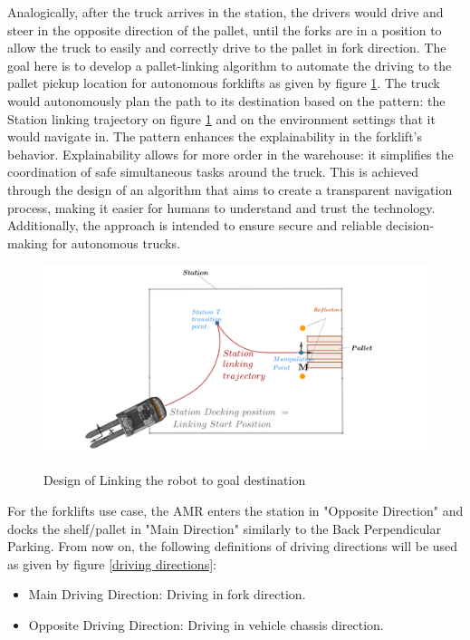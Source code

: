 Analogically, after the truck arrives in the station, the drivers would drive and steer in the opposite direction of the 
pallet, until the forks are in a position to allow the truck to easily and correctly drive to the pallet in fork direction.
The goal here is to develop a pallet-linking algorithm to automate the driving to the pallet pickup location for 
autonomous forklifts as given by figure \ref{pattern}. The truck would autonomously plan the path to its destination
based on the pattern: the Station linking trajectory on figure \ref{pattern} and on the environment settings that it would navigate in. 
The pattern enhances the explainability in the forklift's behavior. Explainability allows for more order in the warehouse: 
it simplifies the coordination of safe simultaneous tasks around the truck. This is achieved through the design of an 
algorithm that aims to create a transparent navigation process, making it easier for humans to understand and trust 
the technology. Additionally, the approach is intended to ensure secure and reliable decision-making for autonomous trucks.



\begin{figure}
    [H]
    \begin{center}
    \includegraphics[width=\linewidth]{images/Chap2/station-without-subpolygones.png}\\
    \caption{Design of Linking the robot to goal destination \cite{R28}}
    \label{pattern}
    \end{center}
\end{figure}
For the forklifts use case, the AMR enters the station in "Opposite Direction" and docks the shelf/pallet in 
"Main Direction" similarly to the Back Perpendicular Parking.
From now on, the following definitions of driving directions will be used as given by figure \ref{driving directions}:
\begin{itemize}
    \item Main Driving Direction: Driving in fork direction.
    \item Opposite Driving Direction: Driving in vehicle chassis direction.
\end{itemize}

